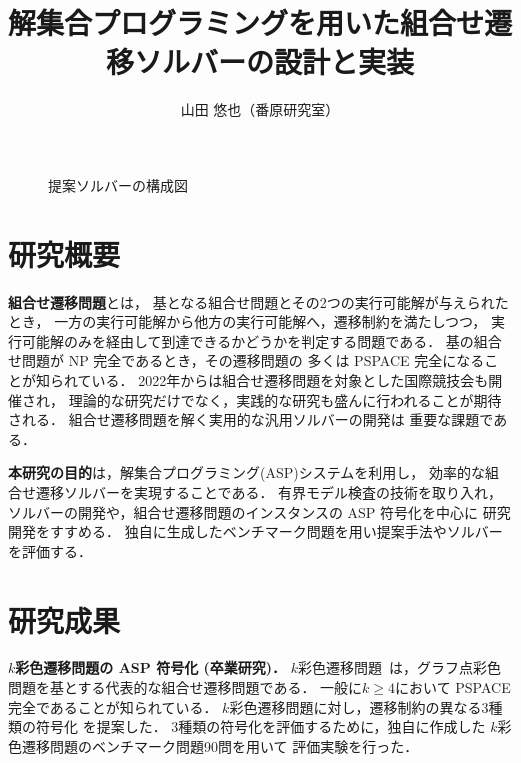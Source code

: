 \documentclass[a4j,10pt,dvipdfmx]{jarticle}
\title{解集合プログラミングを用いた組合せ遷移ソルバーの設計と実装}
\author{山田 悠也（番原研究室）}
\date{}
\newcommand{\code}[1]{\lstinline[basicstyle=\ttfamily]{#1}}
\begin{document}
\maketitle
\thispagestyle{empty}

\begin{figure}[H]
  \centering
  
  \caption{提案ソルバーの構成図}
  \label{fig:bcr}
\end{figure}

\begin{multicols}{1}

\section{研究概要}
\textbf{組合せ遷移問題}とは，
基となる組合せ問題とその2つの実行可能解が与えられたとき，
一方の実行可能解から他方の実行可能解へ，遷移制約を満たしつつ，
実行可能解のみを経由して到達できるかどうかを判定する問題である．
基の組合せ問題が NP 完全であるとき，その遷移問題の
多くは PSPACE 完全になることが知られている．
2022年からは組合せ遷移問題を対象とした国際競技会も開催され，
理論的な研究だけでなく，実践的な研究も盛んに行われることが期待される．
組合せ遷移問題を解く実用的な汎用ソルバーの開発は
重要な課題である．

%
%

\textbf{本研究の目的}は，解集合プログラミング(ASP)システムを利用し，
効率的な組合せ遷移ソルバーを実現することである．
有界モデル検査の技術を取り入れ，
ソルバーの開発や，組合せ遷移問題のインスタンスの ASP 符号化を中心に
研究開発をすすめる．
独自に生成したベンチマーク問題を用い提案手法やソルバーを評価する．

\section{研究成果}
\textbf{$k$彩色遷移問題の ASP 符号化 (卒業研究)．}
$k$彩色遷移問題~\cite{core:gcp:BonsmaC09}は，グラフ点彩色問題を基とする代表的な組合せ遷移問題である．
一般に$k \ge 4$において PSPACE 完全であることが知られている．
$k$彩色遷移問題に対し，遷移制約の異なる3種類の符号化
を提案した．
3種類の符号化を評価するために，独自に作成した
$k$彩色遷移問題のベンチマーク問題90問を用いて
評価実験を行った．


\end{multicols}
\end{document}
